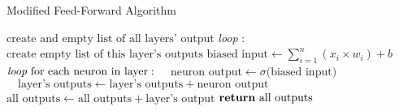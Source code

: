 \def\BState{\State\hskip-\ALG@thistlm}
\begin{algorithm}
\caption{Modified Feed-Forward Algorithm}\label{euclid}
\begin{algorithmic}[1]
\State $\text{create and empty list of all layers' output}$ %
\State \emph{loop} : %
\State \enspace\enspace$\text{create empty list of this layer's outputs}$
\State \enspace\enspace$\text{biased input}\gets\sum\limits_{i=1}^n (x_i\times w_i)+b$
\State \enspace\enspace$\emph{loop} \text{ for each neuron in layer}:$
\State \enspace\enspace$\enspace\enspace \text{neuron output}\gets\sigma\text{(biased input)}$
\State \enspace\enspace$\enspace\enspace \text{layer's outputs}\gets\text{layer's outputs}+\text{neuron output}$
\State \enspace\enspace$\text{all outputs}\gets\text{all outputs}+\text{layer's output}$
\State $\Return \text{ all outputs}$ %
\EndProcedure
\end{algorithmic}
\end{algorithm}